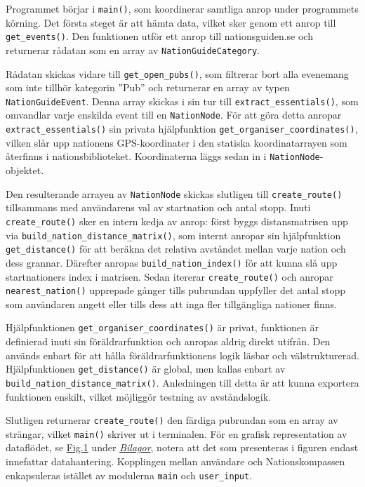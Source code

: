 \documentclass[a4paper, 12pt]{article}
\begin{document}
        Programmet börjar i \texttt{main()}, som koordinerar samtliga anrop under programmets körning. Det första steget är att hämta data, vilket sker genom ett anrop till \texttt{get\_events()}. Den funktionen utför ett anrop till nationsguiden.se och returnerar rådatan som en array av \texttt{NationGuideCategory}.


        Rådatan skickas vidare till \texttt{get\_open\_pubs()}, som filtrerar bort alla evenemang som inte tillhör kategorin ''Pub'' och returnerar en array av typen \texttt{NationGuideEvent}. Denna array skickas i sin tur till \texttt{extract\_essentials()}, som omvandlar varje enskilda event till en \texttt{NationNode}. För att göra detta anropar \texttt{extract\_essentials()} sin privata hjälpfunktion \texttt{get\_organiser\_coordinates()}, vilken slår upp nationens GPS-koordinater i den statiska koordinatarrayen som återfinns i nationsbiblioteket. Koordinaterna läggs sedan in i \texttt{NationNode}-objektet.


        Den resulterande arrayen av \texttt{NationNode} skickas slutligen till \texttt{create\_route()} tillsammans med användarens val av startnation och antal stopp. Inuti \texttt{create\_route()} sker en intern kedja av anrop: först byggs distansmatrisen upp via \texttt{build\_nation\_distance\_matrix()}, som internt anropar sin hjälpfunktion \texttt{get\_distance()} för att beräkna det relativa avståndet mellan varje nation och dess grannar. Därefter anropas \texttt{build\_nation\_index()} för att kunna slå upp startnationers index i matrisen. Sedan itererar \texttt{create\_route()} och anropar \texttt{nearest\_nation()} upprepade gånger tills pubrundan uppfyller det antal stopp som användaren angett eller tills dess att inga fler tillgängliga nationer finns.


        Hjälpfunktionen \texttt{get\_organiser\_coordinates()} är privat, funktionen är definierad inuti sin föräldrarfunktion och anropas aldrig direkt utifrån. Den används enbart för att hålla föräldrarfunktionens logik läsbar och välstrukturerad. Hjälpfunktionen \texttt{get\_distance()} är global, men kallas enbart av \texttt{build\_nation\_distance\_matrix()}. Anledningen till detta är att kunna exportera funktionen enskilt, vilket möjliggör testning av avståndslogik.


        Slutligen returnerar \texttt{create\_route()} den färdiga pubrundan som en array av strängar, vilket \texttt{main()} skriver ut i terminalen. För en grafisk representation av dataflödet, se \hyperref[fig:dataflöde]{Fig.1} under \hyperref[sec: bilagor]{\textit{Bilagor}}, notera att det som presenteras i figuren endast innefattar datahantering. Kopplingen mellan användare och Nationskompassen enkapsuleras istället av modulerna \texttt{main} och \texttt{user\_input}.
\end{document}
